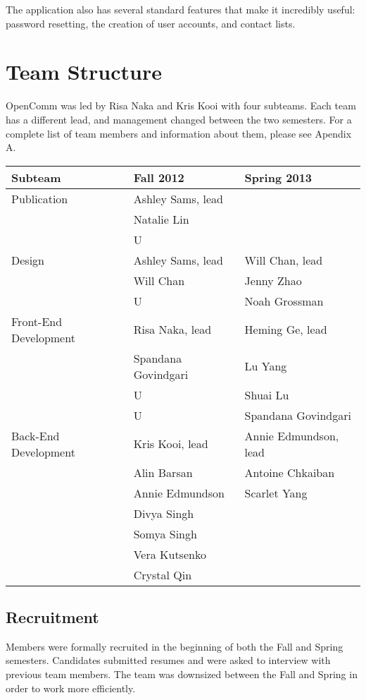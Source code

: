 \documentclass[12pt, letterpaper]{article}
\begin{document}
The application also has several standard features that make it incredibly useful: password resetting, the creation of user accounts, and contact lists. 

\section{Team Structure}
OpenComm was led by Risa Naka and Kris Kooi with four subteams.  Each team has a different lead, and management changed between the two semesters.  For a complete list of team members and information about them, please see Apendix A.  

\begin{table}[tb]
\centering
\begin{tabular}{| l | l | l |}
\hline
Subteam & Fall 2012 & Spring 2013\\
\hline
\hline
Publication & Ashley Sams, lead &  \\
  & Natalie Lin &  \\
  & U & \\
\hline
Design & Ashley Sams, lead & Will Chan, lead\\
  & Will Chan & Jenny Zhao\\
  & U & Noah Grossman\\
\hline
Front-End Development & Risa Naka, lead & Heming Ge, lead\\
  & Spandana Govindgari & Lu Yang\\
  & U & Shuai Lu\\
  & U & Spandana Govindgari\\
\hline
Back-End Development & Kris Kooi, lead & Annie Edmundson, lead\\
  & Alin Barsan & Antoine Chkaiban\\
  & Annie Edmundson & Scarlet Yang\\
  & Divya Singh &  \\
  & Somya Singh &  \\
  & Vera Kutsenko &  \\
  & Crystal Qin & \\
\hline
\end{tabular}
\vspace{0.3cm}
\end{table}

\subsection{Recruitment}
Members were formally recruited in the beginning of both the Fall and Spring semesters.  Candidates submitted resumes and were asked to interview with previous team members.  The team was downsized between the Fall and Spring in order to work more efficiently.  
\end{document}
